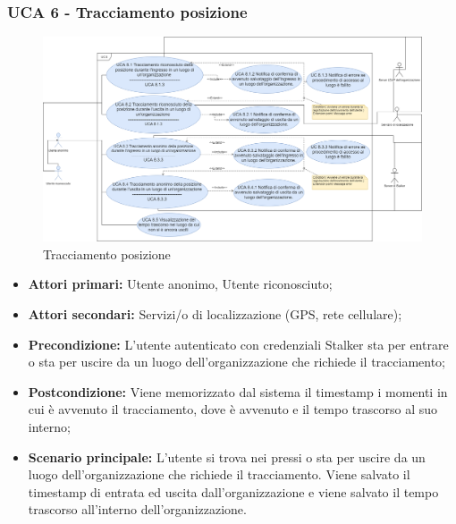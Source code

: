 \newpage

\subsubsection{UCA 6 - Tracciamento posizione}%

\begin{figure}[h]
	\centering
	\includegraphics[scale=0.3]{sezioni/UseCase/Immagini/UCA6.png}
	\caption{Tracciamento posizione}
\end{figure}

\begin{itemize}
	\item \textbf{Attori primari:} Utente anonimo, Utente riconosciuto;
	\item \textbf{Attori secondari:} Servizi/o di localizzazione (GPS, rete cellulare);
	\item \textbf{Precondizione:} L'utente autenticato con credenziali Stalker sta per entrare o sta per uscire da un luogo dell'organizzazione che richiede il tracciamento;
	\item \textbf{Postcondizione:} Viene memorizzato dal sistema il timestamp i momenti in cui è avvenuto il tracciamento, dove è avvenuto e il tempo trascorso al suo interno;
	\item \textbf{Scenario principale:} L'utente si trova nei pressi o sta per uscire da un luogo dell'organizzazione che richiede il tracciamento. Viene salvato il timestamp di entrata ed uscita dall'organizzazione e viene salvato il tempo trascorso all'interno dell'organizzazione.
\end{itemize}


